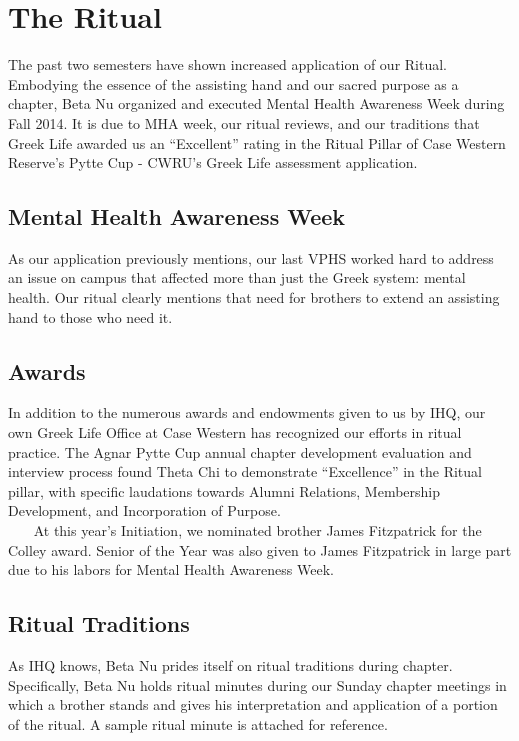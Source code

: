 \chapter{The Ritual}

  The past two semesters have shown increased application of our Ritual. Embodying the essence of the assisting hand and our sacred purpose as a chapter, Beta Nu organized and executed Mental Health Awareness Week during Fall 2014. It is due to MHA week, our ritual reviews, and our traditions that Greek Life awarded us an ``Excellent'' rating in the Ritual Pillar of Case Western Reserve’s Pytte Cup - CWRU’s Greek Life assessment application.

  \section*{Mental Health Awareness Week}
    As our application previously mentions, our last VPHS worked hard to address an issue on campus that affected more than just the Greek system: mental health. Our ritual clearly mentions that need for brothers to extend an assisting hand to those who need it. 
    
  \section*{Awards}
    In addition to the numerous awards and endowments given to us by IHQ, our own Greek Life Office at Case Western has recognized our efforts in ritual practice. The Agnar Pytte Cup annual chapter development evaluation and interview process found Theta Chi to demonstrate “Excellence” in the Ritual pillar, with specific laudations towards Alumni Relations, Membership Development, and Incorporation of Purpose. \\
    
    At this year's Initiation, we nominated brother James Fitzpatrick for the Colley award. Senior of the Year was also given to James Fitzpatrick in large part due to his labors for Mental Health Awareness Week. 
    
  \section*{Ritual Traditions}
    As IHQ knows, Beta Nu prides itself on ritual traditions during chapter. Specifically, Beta Nu holds ritual minutes during our Sunday chapter meetings in which a brother stands and gives his interpretation and application of a portion of the ritual. A sample ritual minute is attached for reference. \\
    
